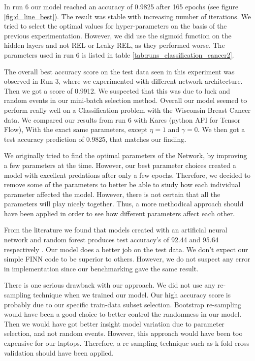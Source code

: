 
In run 6 our model reached an accuracy of 0.9825 after 165 epochs (see figure
\ref{fig:d_line_best}). The result was stable
with increasing number of iterations. We tried to select the optimal values for
hyper-parameters on the basis of the previous experimentation. However, we did
use the sigmoid function on the hidden layers and not REL or Leaky REL, as
they performed worse. The parameters used in run 6 is listed in table
\ref{tab:runs_classification_cancer2}. 

The overall best accuracy score on the test data seen in this experiment was observed in Run
3, where we experimented with different network architecture. Then we got a
score of 0.9912. We suspected that this was due to luck and random events in
our mini-batch selection method. 
Overall our model seemed to perform really well on a Classification problem
with the Wisconsin Breast Cancer data. We compared our results from run 6 with Kares
(python API for Tensor Flow), With the exact same parameters, except $\eta =
1$ and $\gamma = 0$. We then got a test accuracy prediction of 0.9825, that
matches our finding. 


We originally tried to find the optimal parameters of the Network, by improving
a few parameters at the time. However, our best parameter choices created a
model with excellent predations after only a few epochs. Therefore, we decided
to remove some of the parameters to better be able to study how each individual
parameter affected the model. However, there is not certain that all the
parameters will play nicely together. Thus, a more methodical approach should
have been applied in order to see how different parameters affect each other.     


From the literature we found
that models created with an artificial neural network and random forest
produces test accuracy's of 92.44 and 95.64 respectively \cite{Vig2014ComparativeAO}. Our model does a
better job on the test data. We don't expect our simple FINN code to be
superior to others. However, we do not suspect any error in implementation
since our benchmarking gave the same result.   

There is one serious drawback with our approach. We did not use any re-sampling
technique when we trained our model. Our high accuracy score is probably due to
our specific train-data subset selection. Bootstrap re-sampling would have been
a good choice to better control the randomness in our model. Then we would have
got better insight model variation due to parameter selection, and not random
events. However, this approach would have been too expensive for our
laptops. Therefore, a re-sampling technique such as k-fold cross validation
should have been applied.  

